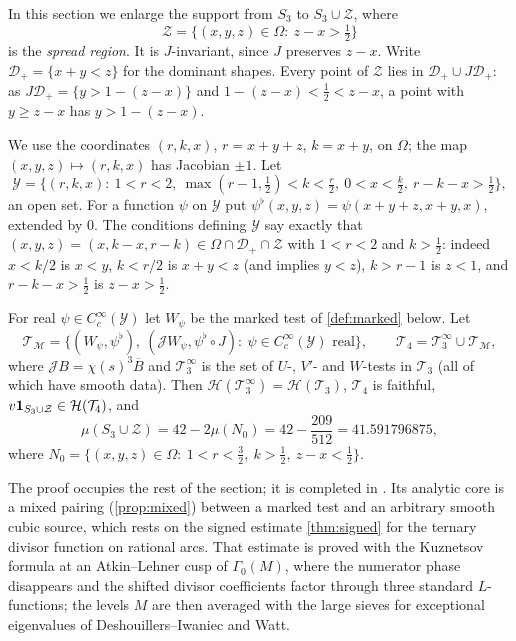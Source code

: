 \documentclass[11pt,colorlinks]{charlie}
\newcommand{\Om}{\Omega}
\begin{document}
In this section we enlarge the support from $S_3$ to $S_3\cup\mathcal Z$, where
\[
 \mathcal Z=\{(x,y,z)\in\Om:\ z-x>\tfrac12\}
\]
is the \emph{spread region}. It is $J$-invariant, since $J$ preserves $z-x$. Write $\mathcal D_+=\{x+y<z\}$ for the dominant shapes. Every point of $\mathcal Z$ lies in $\mathcal D_+\cup J\mathcal D_+$: as $J\mathcal D_+=\{y>1-(z-x)\}$ and $1-(z-x)<\frac12<z-x$, a point with $y\ge z-x$ has $y>1-(z-x)$.

We use the coordinates $(r,k,x)$, $r=x+y+z$, $k=x+y$, on $\Om$; the map $(x,y,z)\mapsto(r,k,x)$ has Jacobian $\pm1$. Let
\[
 \mathcal Y=\Big\{(r,k,x):\ 1<r<2,\ \max(r-1,\tfrac12)<k<\tfrac r2,\ 0<x<\tfrac k2,\ r-k-x>\tfrac12\Big\},
\]
an open set. For a function $\psi$ on $\mathcal Y$ put $\psi^\flat(x,y,z)=\psi(x+y+z,x+y,x)$, extended by $0$. The conditions defining $\mathcal Y$ say exactly that $(x,y,z)=(x,k-x,r-k)\in\Om\cap\mathcal D_+\cap\mathcal Z$ with $1<r<2$ and $k>\frac12$: indeed $x<k/2$ is $x<y$, $k<r/2$ is $x+y<z$ (and implies $y<z$), $k>r-1$ is $z<1$, and $r-k-x>\frac12$ is $z-x>\frac12$.

\begin{theorem}\label{thm:marked}
For real $\psi\in C_c^\infty(\mathcal Y)$ let $W_\psi$ be the marked test of \cref{def:marked} below. Let
\[
 \mathcal T_{\mathcal M}=\big\{(W_\psi,\psi^\flat),\ (\mathcal JW_\psi,\psi^\flat\circ J):\ \psi\in C_c^\infty(\mathcal Y)\text{ real}\big\},\qquad \mathcal T_4=\mathcal T_3^\infty\cup\mathcal T_{\mathcal M},
\]
where $\mathcal JB=\chi(s)^3\overline{B}$ and $\mathcal T_3^\infty$ is the set of $U$-, $V'$- and $W$-tests in $\mathcal T_3$ (all of which have smooth data). Then $\mathcal H(\mathcal T_3^\infty)=\mathcal H(\mathcal T_3)$, $\mathcal T_4$ is faithful, $v\mathbf{1}_{S_3\cup\mathcal Z}\in\mathcal H(\mathcal T_4)$, and
\[
 \mu(S_3\cup\mathcal Z)=42-2\mu(N_0)=42-\frac{209}{512}=41.591796875,
\]
where $N_0=\{(x,y,z)\in\Om:\ 1<r<\tfrac32,\ k>\tfrac12,\ z-x<\tfrac12\}$.
\end{theorem}

The proof occupies the rest of the section; it is completed in . Its analytic core is a mixed pairing (\cref{prop:mixed}) between a marked test and an arbitrary smooth cubic source, which rests on the signed estimate \cref{thm:signed} for the ternary divisor function on rational arcs. That estimate is proved with the Kuznetsov formula at an Atkin--Lehner cusp of $\Gamma_0(M)$, where the numerator phase disappears and the shifted divisor coefficients factor through three standard $L$-functions; the levels $M$ are then averaged with the large sieves for exceptional eigenvalues of Deshouillers--Iwaniec and Watt.
\end{document}
